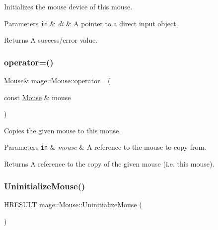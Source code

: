 Initializes the mouse device of this mouse.


\begin{DoxyParams}[1]{Parameters}
\mbox{\tt in}  & {\em di} & A pointer to a direct input object. \\
\hline
\end{DoxyParams}
\begin{DoxyReturn}{Returns}
A success/error value. 
\end{DoxyReturn}
\hypertarget{classmage_1_1_mouse_ae3c9c2063e7323f37bec2bcee773e0e8}{}\label{classmage_1_1_mouse_ae3c9c2063e7323f37bec2bcee773e0e8} 
\subsubsection{\texorpdfstring{operator=()}{operator=()}}
{\footnotesize\ttfamily \hyperlink{classmage_1_1_mouse}{Mouse}\& mage\+::\+Mouse\+::operator= (\begin{DoxyParamCaption}\item[{const \hyperlink{classmage_1_1_mouse}{Mouse} \&}]{mouse }\end{DoxyParamCaption})\hspace{0.3cm}{\ttfamily [private]}}

Copies the given mouse to this mouse.


\begin{DoxyParams}[1]{Parameters}
\mbox{\tt in}  & {\em mouse} & A reference to the mouse to copy from. \\
\hline
\end{DoxyParams}
\begin{DoxyReturn}{Returns}
A reference to the copy of the given mouse (i.\+e. this mouse). 
\end{DoxyReturn}
\hypertarget{classmage_1_1_mouse_a3f4647121d283a95464a0652da2816b0}{}\label{classmage_1_1_mouse_a3f4647121d283a95464a0652da2816b0} 
\subsubsection{\texorpdfstring{Uninitialize\+Mouse()}{UninitializeMouse()}}
{\footnotesize\ttfamily H\+R\+E\+S\+U\+LT mage\+::\+Mouse\+::\+Uninitialize\+Mouse (\begin{DoxyParamCaption}{ }\end{DoxyParamCaption})\hspace{0.3cm}{\ttfamily [protected]}}

